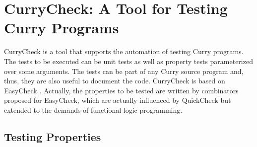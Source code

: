 \section{CurryCheck: A Tool for Testing Curry Programs}

CurryCheck is a tool that supports the automation of
testing Curry programs.
The tests to be executed can be unit tests as well as
property tests parameterized over some arguments.
The tests can be part of any Curry source program
and, thus, they are also useful to document the code.
CurryCheck is based on EasyCheck \cite{ChristiansenFischer08FLOPS}.
Actually, the properties to be tested are written
by combinators proposed for EasyCheck, which are actually
influenced by QuickCheck \cite{ClaessenHughes00}
but extended to the demands of functional logic programming.

\subsection{Testing Properties}

